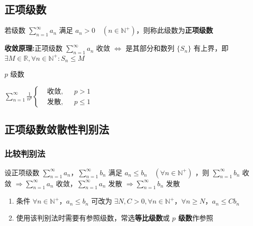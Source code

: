 \documentclass[lang = zh , final , oneside , openany , titlepage , zihao = -4 , linespread = 1.3 , baselineskip = false , cjk-font = windows , text-font = newtx , math-font = newtx , math-style = ISO , uppercase-greek = upright , integral-limits = false]{sjtureport}
\begin{document}
\subsection{正项级数}

\begin{definition}
    若级数 \(\displaystyle \sum_{n=1}^\infty a_n\) 满足
\(a_n >0 \quad \left(n\in\mathbb{N}^+\right)\)，则称此级数为\textbf{正项级数}
\end{definition}

\begin{theorem}
    \textbf{收敛原理:}正项级数 \(\displaystyle \sum_{n=1}^\infty a_n\) 收敛
\(\Leftrightarrow\) 是其部分和数列 \(\{S_n\}\) 有上界，即
\(\exists M\in\mathbb{R},\forall n \in \mathbb{N}^+:S_n \leq M\)
\end{theorem}

\begin{remark}
    \(p\) 级数

\(\displaystyle \sum_{n=1}^\infty \frac{1}{n^p} \left\{\begin{aligned}&\text{收敛}  ,&&p>1\\ &\text{发散} ,&&p\leq 1\end{aligned}\right.\)
\end{remark}

\subsection{正项级数敛散性判别法}

\subsubsection{比较判别法}

\begin{theorem}
    设正项级数
\(\displaystyle \sum_{n=1}^\infty a_n\)，\(\displaystyle \sum_{n=1}^\infty b_n\)
满足 \(a_n \leq b_n \quad (\forall n \in \mathbb{N}^+)\) ，则
\(\displaystyle \sum_{n=1}^\infty b_n\) 收敛
\(\Rightarrow \displaystyle \sum_{n=1}^\infty a_n\)
收敛，\(\displaystyle \sum_{n=1}^\infty a_n\) 发散
\(\Rightarrow \displaystyle \sum_{n=1}^\infty b_n\) 发散
\end{theorem}

\begin{enumerate}
\item
  条件 \(\forall n \in \mathbb{N}^+，a_n \leq b_n\) 可改为
  \(\exists N,C >0  ,\forall n\in \mathbb{N}^+，\forall n \geq N，a_n \leq Cb_n\)
\item
  使用该判别法时需要有参照级数，常选\textbf{等比级数}或 \textbf{\(p\)
  级数}作参照
\end{enumerate}
\end{document}
